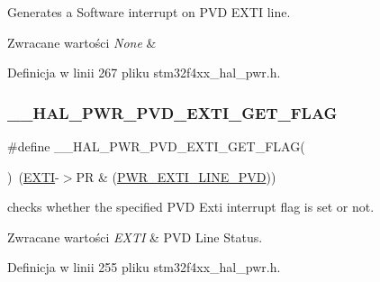 Generates a Software interrupt on P\+VD E\+X\+TI line. 


\begin{DoxyRetVals}{Zwracane wartości}
{\em None} & \\
\hline
\end{DoxyRetVals}


Definicja w linii 267 pliku stm32f4xx\+\_\+hal\+\_\+pwr.\+h.

\mbox{\label{group___p_w_r___exported___macro_ga5e66fa75359b51066e0731ac1e5ae438}} 
\subsubsection{\texorpdfstring{\+\_\+\+\_\+\+H\+A\+L\+\_\+\+P\+W\+R\+\_\+\+P\+V\+D\+\_\+\+E\+X\+T\+I\+\_\+\+G\+E\+T\+\_\+\+F\+L\+AG}{\_\_HAL\_PWR\_PVD\_EXTI\_GET\_FLAG}}
{\footnotesize\ttfamily \#define \+\_\+\+\_\+\+H\+A\+L\+\_\+\+P\+W\+R\+\_\+\+P\+V\+D\+\_\+\+E\+X\+T\+I\+\_\+\+G\+E\+T\+\_\+\+F\+L\+AG(\begin{DoxyParamCaption}{ }\end{DoxyParamCaption})~(\hyperlink{group___peripheral__declaration_ga9189e770cd9b63dadd36683eb9843cac}{E\+X\+TI}-\/$>$PR \& (\hyperlink{group___p_w_r___p_v_d___e_x_t_i___line_ga43a49255649e03d2d2b6b12c5c379d2b}{P\+W\+R\+\_\+\+E\+X\+T\+I\+\_\+\+L\+I\+N\+E\+\_\+\+P\+VD}))}



checks whether the specified P\+VD Exti interrupt flag is set or not. 


\begin{DoxyRetVals}{Zwracane wartości}
{\em E\+X\+TI} & P\+VD Line Status. \\
\hline
\end{DoxyRetVals}


Definicja w linii 255 pliku stm32f4xx\+\_\+hal\+\_\+pwr.\+h.

